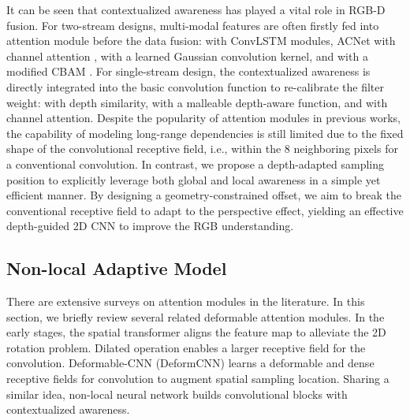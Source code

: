 \documentclass[lettersize,journal]{IEEEtran}
\begin{document}
It can be seen that contextualized awareness has played a vital role in RGB-D fusion. For two-stream designs, multi-modal features are often firstly fed into attention module before the data fusion: \cite{li2016lstm} with ConvLSTM modules, ACNet \cite{hu2019acnet} with channel attention \cite{hu2018senet}, \cite{xiong2020variational} with a learned Gaussian convolution kernel, and \cite{chen2020bi} with a modified CBAM \cite{woo2018cbam}. For single-stream design, the contextualized awareness is directly integrated into the basic convolution function to re-calibrate the filter weight: \cite{Wang2018DCNN} with depth similarity, \cite{xing2020malleable} with a malleable depth-aware function, and \cite{cao2021shapeconv} with channel attention. Despite the popularity of attention modules in previous works, the capability of modeling long-range dependencies is still limited due to the fixed shape of the convolutional receptive field, i.e., within the 8 neighboring pixels for a conventional  convolution. In contrast, we propose a depth-adapted sampling position to explicitly leverage both global and local awareness in a simple yet efficient manner. By designing a geometry-constrained offset, we aim to break the conventional receptive field to adapt to the perspective effect, yielding an effective depth-guided 2D CNN to improve the RGB understanding.


\subsection{Non-local Adaptive Model}


There are extensive surveys on attention modules in the literature. In this section, we briefly review several related deformable attention modules. In the early stages, the spatial transformer \cite{jaderberg2015spatial} aligns the feature map to alleviate the 2D rotation problem. Dilated operation \cite{yu2015Cascade} enables a larger receptive field for the convolution. Deformable-CNN (DeformCNN) \cite{dai2017deformable} learns a deformable and dense receptive fields for convolution to augment spatial sampling location. Sharing a similar idea, non-local neural network \cite{wang2018non} builds convolutional blocks with contextualized awareness.
\end{document}
